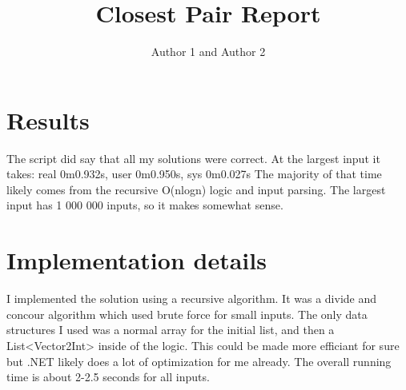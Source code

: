 \documentclass{article}
\title{Closest Pair Report}
\author{Author 1 and Author 2}
\begin{document}
  \maketitle

  \section{Results}

  The script did say that all my solutions were correct. At the largest input it takes:
  real	0m0.932s, user	0m0.950s, sys  0m0.027s
  The majority of that time likely comes from the recursive O(nlogn) logic and input parsing. The largest input has 1 000 000 inputs,
  so it makes somewhat sense.

  \section{Implementation details}


  I implemented the solution using a recursive algorithm. It was a divide and concour algorithm which
  used brute force for small inputs. The only data structures I used was a normal array for the initial list,
  and then a List<Vector2Int> inside of the logic. This could be made more efficiant for sure but .NET likely does
  a lot of optimization for me already.
  The overall running time is about 2-2.5 seconds for all inputs.
\end{document}
